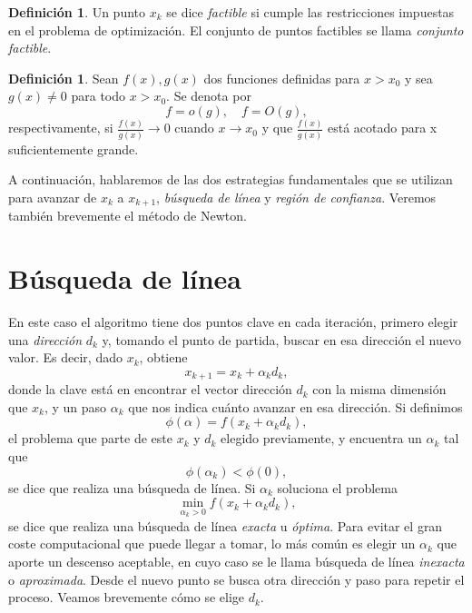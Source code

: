 \documentclass[11pt,a4paper]{book}
\theoremstyle{definition}
\newtheorem{definition}[theorem]{Definición}
\theoremstyle{remark}
\begin{document}
\begin{definition}
	Un punto $x_k$ se dice \textit{factible} si cumple las restricciones impuestas en el
	problema de optimización. El conjunto de puntos factibles se llama \textit{conjunto factible}.
\end{definition}

\begin{definition}
	Sean $f(x), g(x)$ dos funciones definidas para $x>x_0$ y sea $g(x)\neq 0$ para todo $x>x_0$. Se denota por
	\begin{equation}
		f=o(g), \quad f = O(g),
	\end{equation}
	respectivamente, si $\frac{f(x)}{g(x)} \to 0$ cuando $x \to x_0$ y que $\frac{f(x)}{g(x)}$ está acotado para x suficientemente grande.
\end{definition}

A continuación, hablaremos de las dos estrategias fundamentales que se utilizan para
avanzar de $x_k$ a $x_{k+1}$, \textit{búsqueda de línea} y \textit{región de confianza}. Veremos también brevemente el método de Newton.


\section{Búsqueda de línea}

En este caso el algoritmo tiene dos puntos clave en cada iteración, primero elegir
una \textit{dirección} $d_k$ y, tomando el punto de partida, buscar en esa dirección el
nuevo valor. Es decir, dado $x_k$, obtiene
\begin{equation} \label{eq:linesearch}
	x_{k+1} = x_k + \alpha_kd_k,
\end{equation}
donde la clave está en encontrar el vector dirección $d_k$
con la misma dimensión que $x_k$, y un paso $\alpha_k$ que nos indica
cuánto avanzar en esa dirección. Si definimos
\begin{equation}
	\phi(\alpha) = f(x_k+\alpha_kd_k),
\end{equation}
el problema que parte de este $x_k$ y $d_k$ elegido previamente, y encuentra un $\alpha_k$ tal que
\begin{equation}
	\phi(\alpha_k) < \phi(0),
\end{equation}
se dice que realiza una búsqueda de línea. Si $\alpha_k$ soluciona el problema
\begin{equation} \label{min:alphak}
	\min_{\alpha_k>0}f\left(x_k+\alpha_kd_k\right),
\end{equation}
se dice que realiza una búsqueda de línea \textit{exacta} u \textit{óptima}. Para evitar el gran coste computacional que puede llegar a tomar, lo más común es elegir un $\alpha_k$ que aporte un descenso aceptable, en cuyo caso se le llama búsqueda de línea \textit{inexacta} o \textit{aproximada}. Desde el nuevo punto se busca otra dirección y paso para repetir el proceso.
Veamos brevemente cómo se elige $d_k$.
\end{document}

